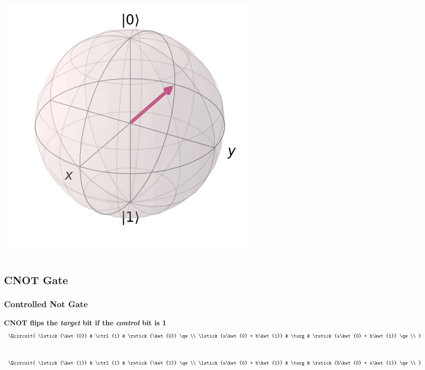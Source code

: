 \documentclass[aspectratio=169,11pt,hyperref={colorlinks=true}]{beamer}
\begin{document}
\begin{frame}
{\begin{columns}
            \includegraphics[width=.9\textwidth]{bloch_h_negative.png}
        \end{columns}
    }
\end{frame}

\subsection{CNOT Gate}
\begin{frame}
    \frametitle{Controlled Not Gate}
    \centering
    \textbf{CNOT flips the \textit{target} bit if the \textit{control} bit is 1}
    \begin{equation*}
        \Qcircuit {
            \lstick{\ket{0}}  & \ctrl{1} & \rstick{\ket{0}} \qw \\ 
            \lstick{a\ket{0} + b\ket{1}} &  \targ & \rstick{a\ket{0} + b\ket{1}} \qw \\
    }
    \end{equation*}\\
    \vspace{3em}
    \begin{equation*}
        \Qcircuit {
            \lstick{\ket{1}} & \ctrl{1} & \rstick{\ket{1}} \qw\\ 
            \lstick{a\ket{0} + b\ket{1}} & \targ & \rstick{b\ket{0} + a\ket{1}} \qw\\
    }
    \end{equation*}
\end{frame}
\end{document}
